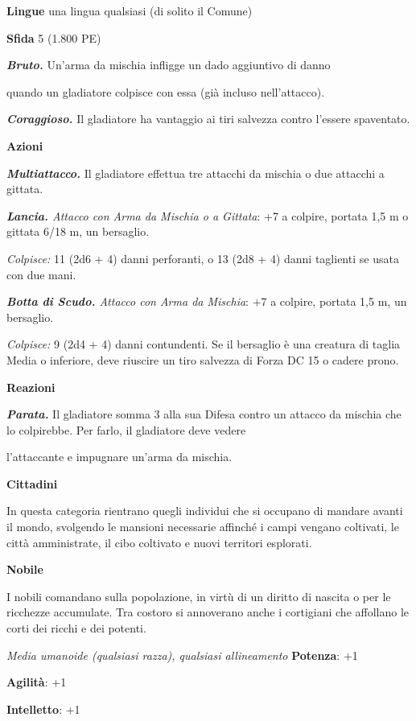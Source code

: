 \begin{multicols}{2}
\textbf{Lingue} una lingua qualsiasi (di solito il Comune)

\textbf{Sfida} 5 (1.800 PE)

\emph{\textbf{Bruto.}} Un'arma da mischia infligge un dado aggiuntivo di
danno

quando un gladiatore colpisce con essa (già incluso nell'attacco).

\emph{\textbf{Coraggioso.}} Il gladiatore ha vantaggio ai tiri salvezza
contro l'essere spaventato.

\textbf{Azioni}

\emph{\textbf{Multiattacco.}} Il gladiatore effettua tre attacchi da
mischia o due attacchi a gittata.

\emph{\textbf{Lancia.} Attacco con Arma da Mischia o a Gittata}: +7 a
colpire, portata 1,5 m o gittata 6/18 m, un bersaglio.

\emph{Colpisce:} 11 (2d6 + 4) danni perforanti, o 13 (2d8 + 4) danni
taglienti se usata con due mani.

\emph{\textbf{Botta di Scudo.} Attacco con Arma da Mischia}: +7 a
colpire, portata 1,5 m, un bersaglio.

\emph{Colpisce:} 9 (2d4 + 4) danni contundenti. Se il bersaglio è una
creatura di taglia Media o inferiore, deve riuscire un tiro salvezza di Forza DC 15 o cadere prono.

\textbf{Reazioni}

\emph{\textbf{Parata.}} Il gladiatore somma 3 alla sua Difesa contro un
attacco da mischia che lo colpirebbe. Per farlo, il gladiatore deve
vedere

l'attaccante e impugnare un'arma da mischia.

\textbf{Cittadini}

In questa categoria rientrano quegli individui che si occupano di
mandare avanti il mondo, svolgendo le mansioni necessarie affinché i
campi vengano coltivati, le città amministrate, il cibo coltivato e
nuovi territori esplorati.

\textbf{Nobile}

I nobili comandano sulla popolazione, in virtù di un diritto di nascita
o per le ricchezze accumulate. Tra costoro si annoverano anche i
cortigiani che affollano le corti dei ricchi e dei potenti.

\emph{Media umanoide (qualsiasi razza), qualsiasi allineamento}
\textbf{Potenza}: +1

\textbf{Agilità}: +1

\textbf{Intelletto}: +1


\end{multicols}
